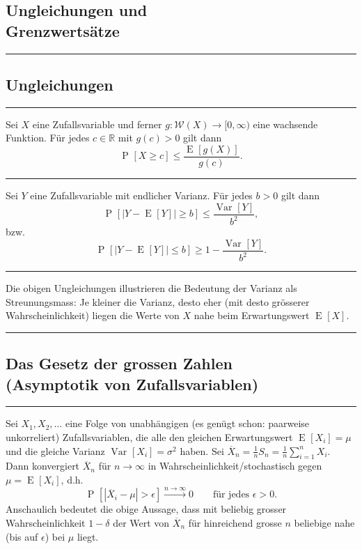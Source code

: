 \documentclass[a4paper, 12pt]{extarticle}
\newcommand{\sep}{\vspace{5pt}\noindent\hrule\vspace{5pt}}
\newcommand{\R}{\mathbb{R}}
\newcommand{\cW}{\mathcal{W}}
\newcommand{\abs}[1]{\left\lvert #1 \right\rvert}
\newcommand{\Prob}[2][]{\operatorname{P}_{#1}\left[ #2 \right]}
\newcommand{\Var}[2][]{\operatorname{Var}_{#1}\left[ #2 \right]}
\newcommand{\Exp}[2][]{\operatorname{E}_{#1}\left[ #2 \right]}
\begin{document}
\begin{multicols*}{2}
\section{Ungleichungen und\\ Grenzwertsätze}

\sep

\subsection{Ungleichungen}

\sep

 Sei $X$ eine Zufallsvariable und ferner
$g\colon\cW(X)\to[0,\infty)$ eine wachsende Funktion. Für jedes $c\in\R$ mit
$g(c)>0$ gilt dann
\[
\Prob{X\geq c} \leq \frac{\Exp{g(X)}}{g(c)}.
\]

\sep

 Sei $Y$ eine Zufallsvariable mit endlicher Varianz.
Für jedes $b>0$ gilt dann
\[
\Prob{\abs{Y-\Exp{Y}}\geq b} \leq \frac{\Var{Y}}{b^2},
\]
bzw.
\[
\Prob{\abs{Y-\Exp{Y}}\leq b} \geq 1- \frac{\Var{Y}}{b^2}.
\]

\sep

Die obigen Ungleichungen illustrieren die Bedeutung der Varianz als
Streunungsmass: Je kleiner die Varianz, desto eher (mit desto grösserer
Wahrscheinlichkeit) liegen die Werte von $X$ nahe beim Erwartungswert $\Exp{X}$.

\sep

\subsection{Das Gesetz der grossen Zahlen\\ \small(Asymptotik von
Zufallsvariablen)}

\sep

 Sei $X_1,X_2,\ldots$ eine Folge von
unabhängigen (es genügt schon: paarweise unkorreliert) Zufallsvariablen, die
alle den gleichen Erwartungswert $\Exp{X_i}=\mu$ und die gleiche Varianz
$\Var{X_i}=\sigma^2$ haben. Sei
$\overline{X}_n=\frac{1}{n}S_n=\frac{1}{n}\sum_{i=1}^n X_i$. Dann konvergiert
$\overline{X}_n$ für $n\to\infty$ in Wahrscheinlichkeit/stochastisch gegen
$\mu=\Exp{X_i}$, d.h.
\[
\Prob{\abs{\overline{X}_i-\mu}>\epsilon}
\xrightarrow{n \to \infty} 0
 \qquad \text{für jedes }\epsilon >0.
\]
Anschaulich bedeutet die obige Aussage, dass mit beliebig grosser
Wahrscheinlichkeit $1-\delta$ der Wert von $\overline{X}_n$ für hinreichend
grosse $n$ beliebige nahe (bis auf $\epsilon$) bei $\mu$ liegt.


\end{multicols*}
\end{document}
